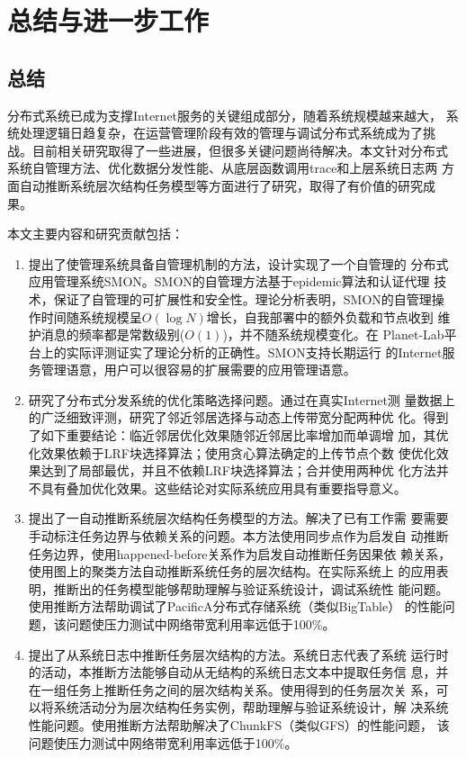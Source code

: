 \chapter{总结与进一步工作}
\label{chap:conclusion}

\section{总结}

分布式系统已成为支撑Internet服务的关键组成部分，随着系统规模越来越大，
系统处理逻辑日趋复杂，在运营管理阶段有效的管理与调试分布式系统成为了挑
战。目前相关研究取得了一些进展，但很多关键问题尚待解决。本文针对分布式
系统自管理方法、优化数据分发性能、从底层函数调用trace和上层系统日志两
方面自动推断系统层次结构任务模型等方面进行了研究，取得了有价值的研究成
果。

本文主要内容和研究贡献包括：

\begin{enumerate}
  
    \item 提出了使管理系统具备自管理机制的方法，设计实现了一个自管理的
    分布式应用管理系统SMON。SMON的自管理方法基于epidemic算法和认证代理
    技术，保证了自管理的可扩展性和安全性。理论分析表明，SMON的自管理操
    作时间随系统规模呈$O(\log N)$增长，自我部署中的额外负载和节点收到
    维护消息的频率都是常数级别($O(1)$)，并不随系统规模变化。在
    Planet-Lab平台上的实际评测证实了理论分析的正确性。SMON支持长期运行
    的Internet服务管理语意，用户可以很容易的扩展需要的应用管理语意。

    \item 研究了分布式分发系统的优化策略选择问题。通过在真实Internet测
    量数据上的广泛细致评测，研究了邻近邻居选择与动态上传带宽分配两种优
    化。得到了如下重要结论：临近邻居优化效果随邻近邻居比率增加而单调增
    加，其优化效果依赖于LRF块选择算法；使用贪心算法确定的上传节点个数
    使优化效果达到了局部最优，并且不依赖LRF块选择算法；合并使用两种优
    化方法并不具有叠加优化效果。这些结论对实际系统应用具有重要指导意义。

    \item 提出了一自动推断系统层次结构任务模型的方法。解决了已有工作需
    要需要手动标注任务边界与依赖关系的问题。本方法使用同步点作为启发自
    动推断任务边界，使用happened-before关系作为启发自动推断任务因果依
    赖关系，使用图上的聚类方法自动推断系统任务的层次结构。在实际系统上
    的应用表明，推断出的任务模型能够帮助理解与验证系统设计，调试系统性
    能问题。使用推断方法帮助调试了PacificA分布式存储系统（类似BigTable）
    的性能问题，该问题使压力测试中网络带宽利用率远低于100\%。

    \item 提出了从系统日志中推断任务层次结构的方法。系统日志代表了系统
    运行时的活动，本推断方法能够自动从无结构的系统日志文本中提取任务信
    息，并在一组任务上推断任务之间的层次结构关系。使用得到的任务层次关
    系，可以将系统活动分为层次结构任务实例，帮助理解与验证系统设计，解
    决系统性能问题。使用推断方法帮助解决了ChunkFS（类似GFS）的性能问题，
    该问题使压力测试中网络带宽利用率远低于100\%。

\end{enumerate}

